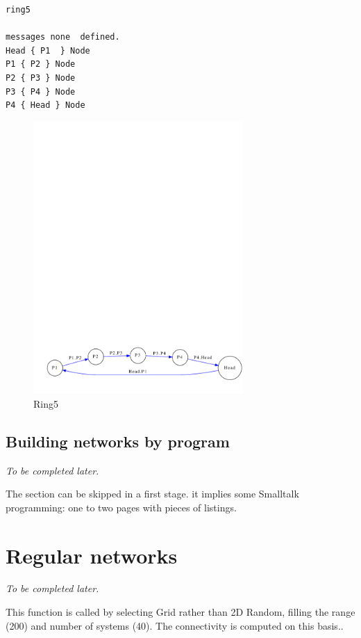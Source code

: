 \documentclass[times,a4paper]{book}
\begin{document}
\begin{lstlisting} 
ring5

messages none  defined. 
Head { P1  } Node 
P1 { P2 } Node  
P2 { P3 } Node  
P3 { P4 } Node  
P4 { Head } Node 
\end{lstlisting}

\begin{figure}[hbtp]
\begin{center} 
\includegraphics[width=8cm]{ring5-rogne.pdf}
\caption{Ring5}
\label{fig:ring5}
\end{center}
\end{figure}

\subsection{Building networks by program}

{\sl To be completed later.}

The section can be skipped in a first stage. it implies some Smalltalk programming: one to two pages
with pieces of listings.

\section {Regular networks}

{\sl To be completed later.}

 This function is called by selecting Grid rather than 2D Random, filling the range (200) and
number of systems (40). The connectivity is computed on this basis..
\end{document}

